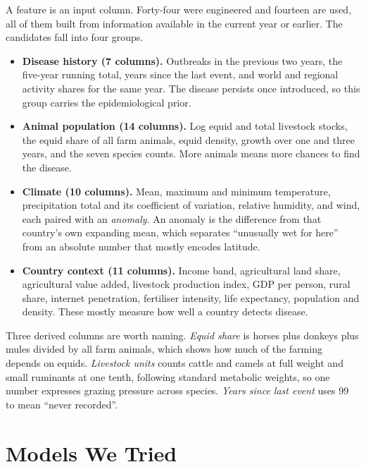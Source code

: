 \documentclass[10pt]{article}
\begin{document}
A feature is an input column. Forty-four were engineered and fourteen are used, all of them built
from information available in the current year or earlier. The candidates fall into four groups.

\begin{itemize}
\setlength{\itemsep}{0.15em}
\item \textbf{Disease history (7 columns).} Outbreaks in the previous two years, the
      five-year running total, years since the last event, and world and regional activity
      shares for the same year. The disease persists once introduced, so this group carries
      the epidemiological prior.
\item \textbf{Animal population (14 columns).} Log equid and total livestock stocks, the
      equid share of all farm animals, equid density, growth over one and three years, and
      the seven species counts. More animals means more chances to find the disease.
\item \textbf{Climate (10 columns).} Mean, maximum and minimum temperature, precipitation
      total and its coefficient of variation, relative humidity, and wind, each paired with
      an \emph{anomaly}. An anomaly is the difference from that country's own expanding
      mean, which separates ``unusually wet for here'' from an absolute number that mostly
      encodes latitude.
\item \textbf{Country context (11 columns).} Income band, agricultural land share,
      agricultural value added, livestock production index, GDP per person, rural share,
      internet penetration, fertiliser intensity, life expectancy, population and density.
      These mostly measure how well a country detects disease.
\end{itemize}

Three derived columns are worth naming. \emph{Equid share} is horses plus donkeys plus
mules divided by all farm animals, which shows how much of the farming depends on equids.
\emph{Livestock units} counts cattle and camels at full weight and small ruminants at one
tenth, following standard metabolic weights, so one number expresses grazing pressure
across species. \emph{Years since last event} uses 99 to mean ``never recorded''.

\section{Models We Tried}
\end{document}
